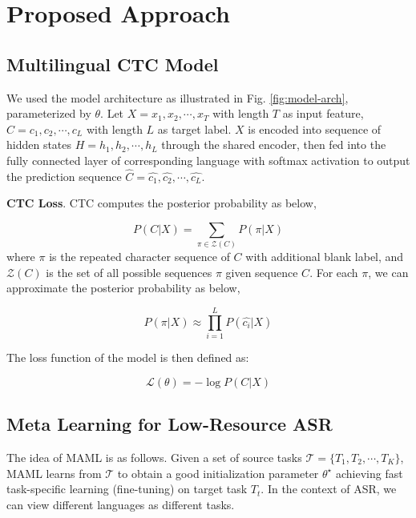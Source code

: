 \section{Proposed Approach}
\label{sec:approach}

\subsection{Multilingual CTC Model}

We used the model architecture as illustrated in Fig. \ref{fig:model-arch}, parameterized by $\theta$. Let $X = x_1, x_2, \cdots, x_T$ with length $T$ as input feature, $C = c_1, c_2, \cdots, c_L$ with length $L$ as target label. $X$ is encoded into sequence of hidden states $H = h_1, h_2, \cdots, h_L$ through the shared encoder, then fed into the fully connected layer of corresponding language with softmax activation to output the prediction sequence $\hat{C} = \hat{c_1}, \hat{c_2}, \cdots, \hat{c_L}$.

\textbf{CTC Loss}. CTC computes the posterior probability as below,

\begin{equation}
  P(C|X) = \sum_{\pi \in \mathcal{Z}(C)} P(\pi|X)
\end{equation}
where $\pi$ is the repeated character sequence  of $C$ with additional blank label, and $\mathcal{Z}(C)$ is the set of all possible sequences $\pi$ given sequence $C$. For each $\pi$, we can approximate the posterior probability as below,

\begin{equation}
  P(\pi|X) \approx \prod_{i=1}^{L} P(\hat{c_i}|X)
\end{equation}

The loss function of the model is then defined as:

\begin{equation}
  \label{eq:ctc-loss}
  \mathcal{L}(\theta) = - \log P(C|X)
\end{equation}

\subsection{Meta Learning for Low-Resource ASR}

The idea of MAML is as follows. Given a set of source tasks $\mathcal{T}=\lbrace T_1, T_2, \cdots, T_K \rbrace$, MAML learns from $\mathcal{T}$ to obtain a good initialization parameter $\theta^{\star}$ achieving fast task-specific learning (fine-tuning) on target task $T_t$. In the context of ASR, we can view different languages as different tasks.

